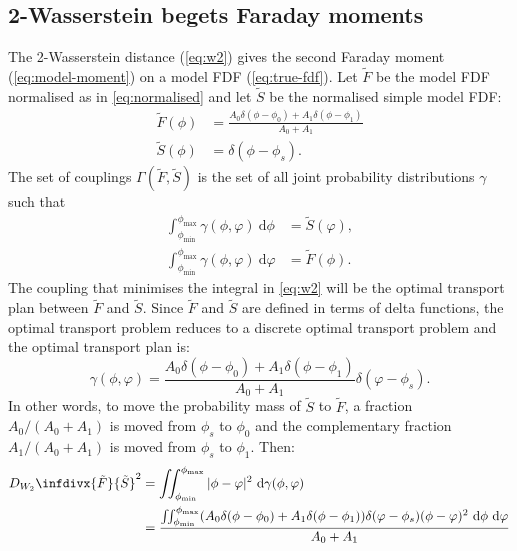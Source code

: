 \begin{appendix}
  \section{2-Wasserstein begets Faraday moments}
  \label{sec:w2-to-faraday-moments}
    The 2-Wasserstein distance (\autoref{eq:w2}) gives the second Faraday moment (\autoref{eq:model-moment}) on a model FDF (\autoref{eq:true-fdf}). Let $\tilde F$ be the model FDF normalised as in \autoref{eq:normalised} and let $\tilde S$ be the normalised simple model FDF:
    \begin{align}
      \tilde F(\phi) &= \frac{A_0 \delta(\phi - \phi_0) + A_1 \delta(\phi - \phi_1)}{A_0 + A_1}\\
      \tilde S(\phi) &= \delta(\phi - \phi_s).
    \end{align}
    The set of couplings $\Gamma(\tilde F, \tilde S)$ is the set of all joint probability distributions $\gamma$ such that
    \begin{align}
      \int_{\phi_{\min}}^{\phi_{\max}} \gamma(\phi, \varphi)\ \mathrm{d}\phi &= \tilde S(\varphi),\\
      \int_{\phi_{\min}}^{\phi_{\max}} \gamma(\phi, \varphi)\ \mathrm{d}\varphi &= \tilde F(\phi).
    \end{align}
    The coupling that minimises the integral in \autoref{eq:w2} will be the optimal transport plan between $\tilde F$ and $\tilde S$. Since $\tilde F$ and $\tilde S$ are defined in terms of delta functions, the optimal transport problem reduces to a discrete optimal transport problem and the optimal transport plan is:
    \begin{equation}
      \gamma(\phi, \varphi) = \frac{A_0 \delta(\phi - \phi_0) + A_1 \delta(\phi - \phi_1)}{A_0 + A_1} \delta(\varphi - \phi_s).
    \end{equation}
    In other words, to move the probability mass of $\tilde S$ to $\tilde F$, a fraction $A_0/(A_0 + A_1)$ is moved from $\phi_s$ to $\phi_0$ and the complementary fraction $A_1/(A_0 + A_1)$ is moved from $\phi_s$ to $\phi_1$. Then:
    \begin{align}
      D_{W_2}\infdivx{\tilde F}{\tilde S}^2 &= \iint_{\phi_{\min}}^{\phi_{\max}} |\phi - \varphi|^2\ \mathrm{d}\gamma(\phi, \varphi)\\
        &= \frac{\iint_{\phi_{\min}}^{\phi_{\max}} (A_0 \delta(\phi - \phi_0) + A_1 \delta(\phi - \phi_1)) \delta(\varphi - \phi_s) (\phi - \varphi)^2\ \mathrm{d}\phi\ \mathrm{d}\varphi}{A_0 + A_1}\\

\end{align}
\end{appendix}
